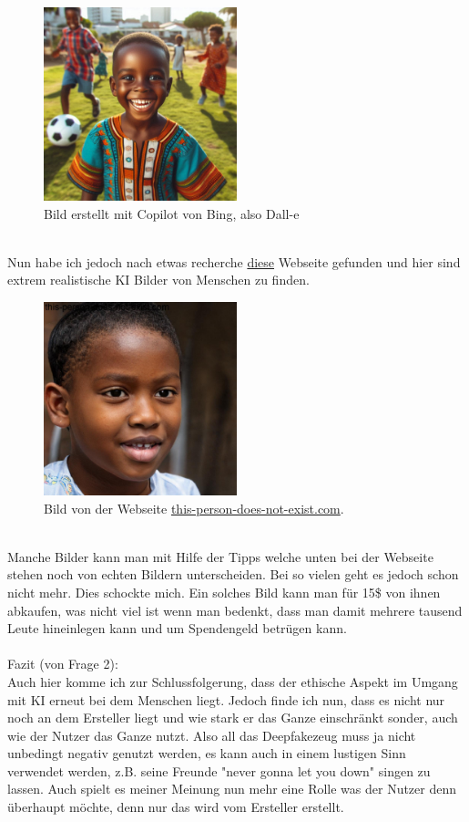 \begin{figure}[h]
    \centering
    \includegraphics[width=0.5\textwidth]{copilot(dall-e).jpeg}
    \caption{Bild erstellt mit Copilot von Bing, also Dall-e}
    \label{fig:random_img}
\end{figure}
\\Nun habe ich jedoch nach etwas recherche \href{https://this-person-does-not-exist.com}{diese} Webseite gefunden und hier sind extrem realistische KI Bilder von Menschen zu finden.
\begin{figure}[h]
    \centering
    \includegraphics[width=0.5\textwidth]{this_person_does_not_exist.jpeg}
    \caption{Bild von der Webseite \href{https://this-person-does-not-exist.com}{this-person-does-not-exist.com}.}
    \label{fig:random_img}
\end{figure}
\\Manche Bilder kann man mit Hilfe der Tipps welche unten bei der Webseite stehen noch von echten Bildern unterscheiden. Bei so vielen geht es jedoch schon nicht mehr. Dies schockte mich. Ein solches Bild kann man für 15\$ von ihnen abkaufen, was nicht viel ist wenn man bedenkt, dass man damit mehrere tausend Leute hineinlegen kann und um Spendengeld betrügen kann.
\\
\\{\large Fazit (von Frage 2):}
\\
Auch hier komme ich zur Schlussfolgerung, dass der ethische Aspekt im Umgang mit KI erneut bei dem Menschen liegt. Jedoch finde ich nun, dass es nicht nur noch an dem Ersteller liegt und wie stark er das Ganze einschränkt sonder, auch wie der Nutzer das Ganze nutzt.
Also all das Deepfakezeug muss ja nicht unbedingt negativ genutzt werden, es kann auch in einem lustigen Sinn verwendet werden, z.B. seine Freunde "never gonna let you down" singen zu lassen.
Auch spielt es meiner Meinung nun mehr eine Rolle was der Nutzer denn überhaupt möchte, denn nur das wird vom Ersteller erstellt.
\\
